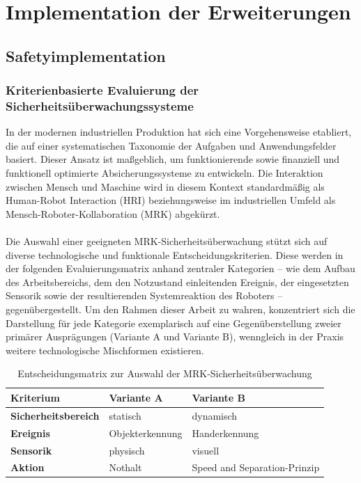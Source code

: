 \chapter{Implementation der Erweiterungen}

\section{Safetyimplementation}
\label{Sichere Mensch-Roboter-Kolaboration}

\subsection{Kriterienbasierte Evaluierung der Sicherheitsüberwachungssysteme}

In der modernen industriellen Produktion hat sich eine Vorgehensweise etabliert, die auf einer systematischen Taxonomie der Aufgaben und Anwendungsfelder basiert. Dieser Ansatz ist maßgeblich, um funktionierende sowie finanziell und funktionell optimierte Absicherungssysteme zu entwickeln. Die Interaktion zwischen Mensch und Maschine wird in diesem Kontext standardmäßig als Human-Robot Interaction (HRI) beziehungsweise im industriellen Umfeld als Mensch-Roboter-Kollaboration (MRK) abgekürzt.
\\
\\Die Auswahl einer geeigneten MRK-Sicherheitsüberwachung stützt sich auf diverse technologische und funktionale Entscheidungskriterien. Diese werden in der folgenden Evaluierungsmatrix anhand zentraler Kategorien – wie dem Aufbau des Arbeitsbereichs, dem den Notzustand einleitenden Ereignis, der eingesetzten Sensorik sowie der resultierenden Systemreaktion des Roboters – gegenübergestellt. Um den Rahmen dieser Arbeit zu wahren, konzentriert sich die Darstellung für jede Kategorie exemplarisch auf eine Gegenüberstellung zweier primärer Ausprägungen (Variante A und Variante B), wenngleich in der Praxis weitere technologische Mischformen existieren.

\begin{table}[htbp]
	\centering
	\begin{tabular}{l|l|l}
		\toprule
		\textbf{Kriterium} & \textbf{Variante A } & \textbf{Variante B } \\
		\midrule
		\textbf{Sicherheitsbereich} & statisch                 & dynamisch \\
		\textbf{Ereignis}       & Objekterkennung          & Handerkennung \\
		\textbf{Sensorik}       & physisch                  & visuell \\
		\textbf{Aktion}         & Nothalt                  & Speed and Separation-Prinzip \\
		\bottomrule
	\end{tabular}
	\caption{Entscheidungsmatrix zur Auswahl der MRK-Sicherheitsüberwachung}
	\label{tab:Entscheidungsmatrix}
\end{table}

